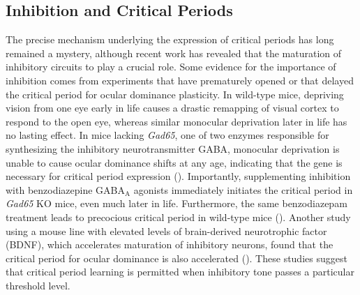 \subsection{Inhibition and Critical Periods}
The precise mechanism underlying the expression of critical periods has long remained a mystery, although recent work has revealed that the maturation of inhibitory circuits to play a crucial role. Some evidence for the importance of inhibition comes from experiments that have prematurely opened or that delayed the critical period for ocular dominance plasticity. In wild-type mice, depriving vision from one eye early in life causes a drastic remapping of visual cortex to respond to the open eye, whereas similar monocular deprivation later in life has no lasting effect. In mice lacking \textit{Gad65}, one of two enzymes responsible for synthesizing the inhibitory neurotransmitter GABA, monocular deprivation is unable to cause ocular dominance shifts at any age, indicating that the gene is necessary for critical period expression (\cite{Fagiolini2000}). Importantly, supplementing inhibition with benzodiazepine GABA$_\mathrm{A}$ agonists immediately initiates the critical period in \textit{Gad65} KO mice, even much later in life. Furthermore, the same benzodiazepam treatment leads to precocious critical period in wild-type mice (\cite{Fagiolini2000}). Another study using a mouse line with elevated levels of brain-derived neurotrophic factor (BDNF), which accelerates maturation of inhibitory neurons, found that the critical period for ocular dominance is also accelerated (\cite{Hanover1999, Huang1999}). These studies suggest that critical period learning is permitted when inhibitory tone passes a particular threshold level.

